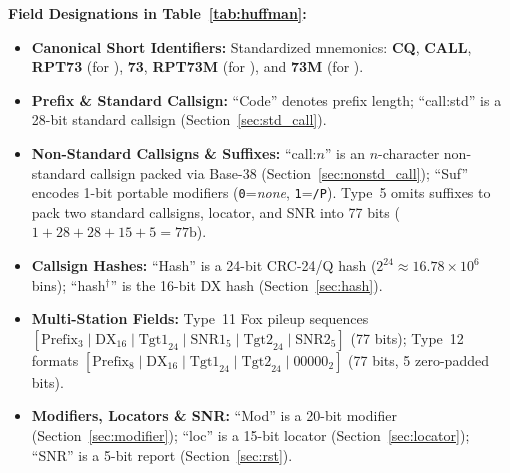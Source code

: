 \textbf{Field Designations in Table~\ref{tab:huffman}:}
\begin{itemize}[leftmargin=1.4em, itemsep=1.5pt plus 1.0pt minus 0.5pt, topsep=2pt plus 1.0pt minus 0.5pt, parsep=0pt]
  \item \textbf{Canonical Short Identifiers:} Standardized mnemonics: \textbf{CQ}, \textbf{CALL}, \textbf{RPT73} (for ), \textbf{73}, \textbf{RPT73M} (for ), and \textbf{73M} (for ).
  \item \textbf{Prefix \& Standard Callsign:} ``Code'' denotes prefix length; ``call:std'' is a 28-bit standard callsign (Section~\ref{sec:std_call}).
  \item \textbf{Non-Standard Callsigns \& Suffixes:} ``call:$n$'' is an $n$-character non-standard callsign packed via Base-38 (Section~\ref{sec:nonstd_call}); ``Suf'' encodes 1-bit portable modifiers (\texttt{0}=\emph{none}, \texttt{1}=\texttt{/P}). Type~5 omits suffixes to pack two standard callsigns, locator, and SNR into 77 bits ($1+28+28+15+5=77\text{b}$).
  \item \textbf{Callsign Hashes:} ``Hash'' is a 24-bit CRC-24/Q hash ($2^{24} \approx 16.78\times 10^6$ bins); ``hash$^\dagger$'' is the 16-bit DX hash (Section~\ref{sec:hash}).
  \item \textbf{Multi-Station Fields:} Type~11 Fox pileup sequences $[\text{Prefix}_3 \mid \text{DX}_{16} \mid \text{Tgt1}_{24} \mid \text{SNR1}_5 \mid \text{Tgt2}_{24} \mid \text{SNR2}_5]$ (77 bits); Type~12 formats $[\text{Prefix}_8 \mid \text{DX}_{16} \mid \text{Tgt1}_{24} \mid \text{Tgt2}_{24} \mid 00000_2]$ (77 bits, 5 zero-padded bits).
  \item \textbf{Modifiers, Locators \& SNR:} ``Mod'' is a 20-bit modifier (Section~\ref{sec:modifier}); ``loc'' is a 15-bit locator (Section~\ref{sec:locator}); ``SNR'' is a 5-bit report (Section~\ref{sec:rst}).
\end{itemize}

